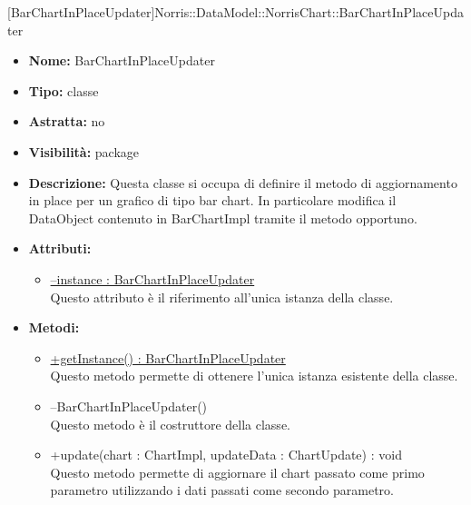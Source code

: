 			
			[BarChartInPlaceUpdater]{Norris::DataModel::NorrisChart::BarChartInPlaceUpdater}
			

	
			
			\begin{itemize}
			\item \textbf{Nome:} BarChartInPlaceUpdater
			\item \textbf{Tipo:} classe
			
		\item \textbf{Astratta:}
		no
			\item \textbf{Visibilità:} package
			\item \textbf{Descrizione:} Questa classe si occupa di definire il metodo di aggiornamento in place per un grafico di tipo bar chart. In particolare modifica il DataObject contenuto in BarChartImpl tramite il metodo opportuno.
			\item \textbf{Attributi:}
				\begin{itemize}
				\setlength{\itemsep}{5pt}
				
					\item[\ding{111}] \underline{--instance : BarChartInPlaceUpdater} \\ [1mm] Questo attributo è il riferimento all'unica istanza della classe.
				\end{itemize}
		
			\item \textbf{Metodi:}
				\begin{itemize}
				\setlength{\itemsep}{5pt}
				
					\item[\ding{111}] {\underline{+getInstance() : BarChartInPlaceUpdater}} \\ [1mm] Questo metodo permette di ottenere l'unica istanza esistente della classe.
					\item[\ding{111}] {{--BarChartInPlaceUpdater()}} \\ [1mm] Questo metodo è il costruttore della classe.
					\item[\ding{111}] {{+update(chart : ChartImpl, updateData : ChartUpdate) : void}} \\ [1mm] Questo metodo permette di aggiornare il chart passato come primo parametro utilizzando i dati passati come secondo parametro.
				\end{itemize}
		
			\end{itemize}

